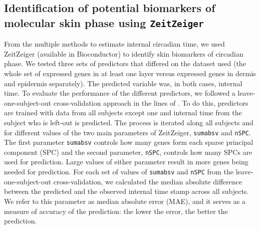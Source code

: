 \subsection*{Identification of potential biomarkers of molecular skin phase using \texttt{ZeitZeiger}}
From the multiple methods to estimate internal circadian time, we used ZeitZeiger \cite{Hughey2016} (available in Bioconductor) to identify skin biomarkers of circadian phase. We tested three sets of predictors that differed on the dataset used (the whole set of expressed genes in at least one layer versus expressed genes in dermis and epidermis separately). The predicted variable was, in both cases, internal time. To evaluate the performance of the different predictors, we followed a leave-one-subject-out cross-validation approach in the lines of \cite{Hughey2016, Wittenbrink2018}. To do this, predictors are trained with data from all subjects except one and internal time from the subject who is left-out is predicted. The process is iterated along all subjects and for different values of the two main parameters of ZeitZeiger, \texttt{sumabsv} and \texttt{nSPC}. The first parameter \texttt{sumabsv} controls how many genes form each sparse principal component (SPC) and the second parameter, \texttt{nSPC}, controls how many SPCs are used for prediction. Large values of either parameter result in more genes being needed for prediction. For each set of values of \texttt{sumabsv} and \texttt{nSPC} from the leave-one-subject-out cross-validation, we calculated the median absolute difference between the predicted and the observed internal time stamp across all subjects. We refer to this parameter as median absolute error (MAE), and it serves as a measure of accuracy of the prediction: the lower the error, the better the prediction. 






